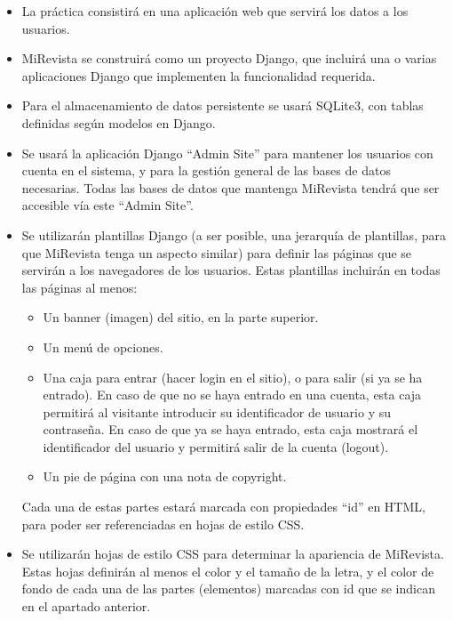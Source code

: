 \begin{itemize}
\item La práctica consistirá en una aplicación web que servirá los datos a los usuarios.

\item MiRevista se construirá como un proyecto Django, que incluirá una o varias aplicaciones Django que implementen la funcionalidad requerida.

\item Para el almacenamiento de datos persistente se usará SQLite3, con tablas definidas según modelos en Django.

\item Se usará la aplicación Django ``Admin Site'' para mantener los usuarios con cuenta en el sistema, y para la gestión general de las bases de datos necesarias. Todas las bases de datos que mantenga MiRevista tendrá que ser accesible vía este ``Admin Site''.

\item Se utilizarán plantillas Django (a ser posible, una jerarquía de plantillas, para que MiRevista tenga un aspecto similar) para definir las páginas que se servirán a los navegadores de los usuarios. Estas plantillas incluirán en todas las páginas al menos:
  \begin{itemize}
  \item Un banner (imagen) del sitio, en la parte superior.
  \item Un menú de opciones.
  \item Una caja para entrar (hacer login en el sitio), o para salir (si ya se ha entrado). En caso de que no se haya entrado en una cuenta, esta caja permitirá al visitante introducir su identificador de usuario y su contraseña. En caso de que ya se haya entrado, esta caja mostrará el identificador del usuario y permitirá salir de la cuenta (logout).
  \item Un pie de página con una nota de copyright.
  \end{itemize}

Cada una de estas partes estará marcada con propiedades ``id'' en HTML, para poder ser referenciadas en hojas de estilo CSS.

\item Se utilizarán hojas de estilo CSS para determinar la apariencia de MiRevista. Estas hojas definirán al menos el color y el tamaño de la letra, y el color de fondo de cada una de las partes (elementos) marcadas con id que se indican en el apartado anterior.
\end{itemize}

